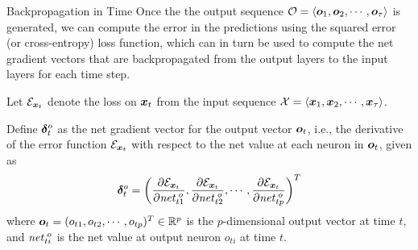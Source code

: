 \begin{frame}{Backpropagation in Time}
Once the the output sequence ${\mathcal O} = \langle {\boldsymbol o}_1,
{\boldsymbol o}_2, \cdots, {\boldsymbol o}_\tau \rangle$ is generated, we can compute the error in the predictions 
using the squared error
(or cross-entropy) loss function, which can in turn be used to compute the
net gradient vectors that are backpropagated from the output layers to the
input layers for each time step.


\medskip


Let ${\mathcal E}_{{\boldsymbol x}_t}$ denote the loss on ${\boldsymbol x}_t$ from the input
sequence ${\mathcal X} = \langle {\boldsymbol x}_1, {\boldsymbol x}_2, \cdots, {\boldsymbol x}_\tau \rangle$.


\medskip

Define ${\bm \delta}^o_t$ as the net gradient vector for the output vector
${\boldsymbol o}_t$, i.e., the
derivative of the error function ${\mathcal E}_{{\boldsymbol x}_t}$
with respect to the net value at each neuron in ${\boldsymbol o}_t$, given as
\begin{align*}
    {\bm \delta}^o_t = \left(
        \frac{\partial {\mathcal E}_{{\boldsymbol x}_t}}{\partial \mathit{net}^{\;o}_{t1}},
        \frac{\partial {\mathcal E}_{{\boldsymbol x}_t}}{\partial \mathit{net}^{\;o}_{t2}},
                \cdots,
                \frac{\partial {\mathcal E}_{{\boldsymbol x}_t}}{\partial \mathit{net}^{\;o}_{tp}}
    \right)^T
\end{align*}
where ${\boldsymbol o}_t = (o_{t1}, o_{t2}, \cdots, o_{tp})^T \in {\mathord{\mathbb R}}^p$ is the
$p$-dimensional output vector at time $t$, and $\mathit{net}^{\;o}_{ti}$ is
the net value at output neuron $o_{ti}$ at time $t$.
\end{frame}


